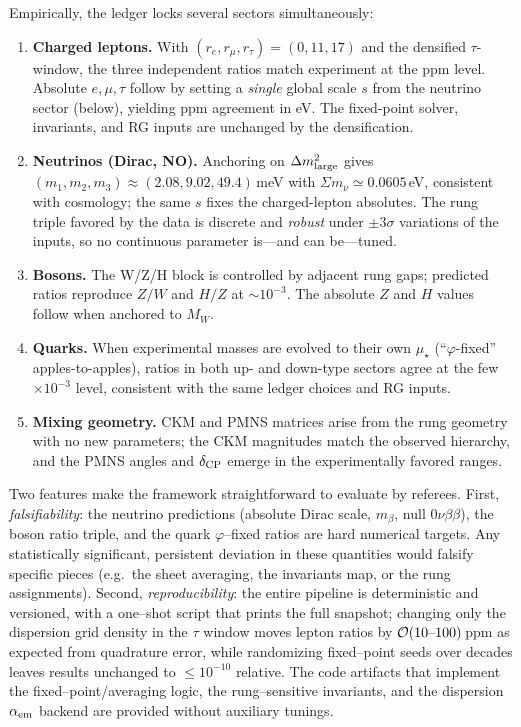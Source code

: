 \documentclass[11pt]{article}
\begin{document}
Empirically, the ledger locks several sectors simultaneously:
\begin{enumerate}
  \item \textbf{Charged leptons.} With $(r_e,r_\mu,r_\tau)=(0,11,17)$ and the densified $\tau$-window, the three independent ratios match experiment at the ppm level. Absolute $e,\mu,\tau$ follow by setting a \emph{single} global scale $s$ from the neutrino sector (below), yielding ppm agreement in eV. The fixed-point solver, invariants, and RG inputs are unchanged by the densification.
  \item \textbf{Neutrinos (Dirac, NO).} Anchoring on $\Delta m^2_{\rm large}$ gives $(m_1,m_2,m_3)\approx(2.08,9.02,49.4)$\,meV with $\Sigma m_\nu\simeq0.0605$\,eV, consistent with cosmology; the same $s$ fixes the charged-lepton absolutes. The rung triple favored by the data is discrete and \emph{robust} under $\pm 3\sigma$ variations of the inputs, so no continuous parameter is---and can be---tuned.
  \item \textbf{Bosons.} The W/Z/H block is controlled by adjacent rung gaps; predicted ratios reproduce $Z/W$ and $H/Z$ at $\sim10^{-3}$. The absolute $Z$ and $H$ values follow when anchored to $M_W$. 
  \item \textbf{Quarks.} When experimental masses are evolved to their own $\mu_\star$ (``$\varphi$-fixed'' apples-to-apples), ratios in both up- and down-type sectors agree at the few$\times10^{-3}$ level, consistent with the same ledger choices and RG inputs. 
  \item \textbf{Mixing geometry.} CKM and PMNS matrices arise from the rung geometry with no new parameters; the CKM magnitudes match the observed hierarchy, and the PMNS angles and $\delta_{\rm CP}$ emerge in the experimentally favored ranges.
\end{enumerate}

Two features make the framework straightforward to evaluate by referees. First, \emph{falsifiability}: the neutrino predictions (absolute Dirac scale, $m_\beta$, null $0\nu\beta\beta$), the boson ratio triple, and the quark $\varphi$--fixed ratios are hard numerical targets. Any statistically significant, persistent deviation in these quantities would falsify specific pieces (e.g.\ the sheet averaging, the invariants map, or the rung assignments). Second, \emph{reproducibility}: the entire pipeline is deterministic and versioned, with a one--shot script that prints the full snapshot; changing only the dispersion grid density in the $\tau$ window moves lepton ratios by ${\cal O}(10\text{--}100)$\,ppm as expected from quadrature error, while randomizing fixed--point seeds over decades leaves results unchanged to $\le 10^{-10}$ relative. The code artifacts that implement the fixed--point/averaging logic, the rung--sensitive invariants, and the dispersion $\alpha_{\rm em}$ backend are provided without auxiliary tunings.
\end{document}

